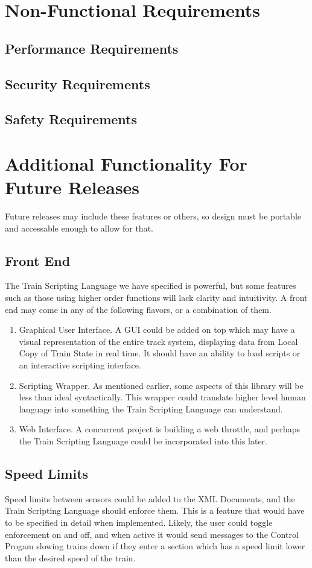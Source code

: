 \documentclass[a4paper,11pt,notitlepage]{article}
\def\TSL{Train Scripting Language\xspace}
\def\CS{Control Progam\xspace} \def\LC{Local Copy of Train State\xspace} \def\TN{Track Node\xspace}
\begin{document}
\newpage
\section{Non-Functional Requirements}
\subsection{Performance Requirements}
\subsection{Security Requirements}
\subsection{Safety Requirements}

\newpage
\section{Additional Functionality For Future Releases}
Future releases may include these features or others, so design must be portable and accessable enough to allow for that.
\subsection{Front End}
The \TSL we have specified is powerful, but some features such as those using higher order functions will lack clarity and intuitivity. A front end may come in any of the following flavors, or a combination of them.
\begin{enumerate}
	\item Graphical User Interface. A GUI could be added on top which may have a visual representation of the entire track system, displaying data from \LC in real time. It should have an ability to load scripts or an interactive scripting interface.
	\item Scripting Wrapper. As mentioned earlier, some aspects of this library will be less than ideal syntactically. This wrapper could translate higher level human language into something the \TSL can understand.
	\item Web Interface. A concurrent project is building a web throttle, and perhaps the \TSL could be incorporated into this later.
\end{enumerate}
\subsection{Speed Limits}
Speed limits between sensors could be added to the XML Documents, and the \TSL should enforce them. This is a feature that would have to be specified in detail when implemented. Likely, the user could toggle enforcement on and off, and when active it would send messages to the \CS slowing trains down if they enter a section which has a speed limit lower than the desired speed of the train.
\end{document}
